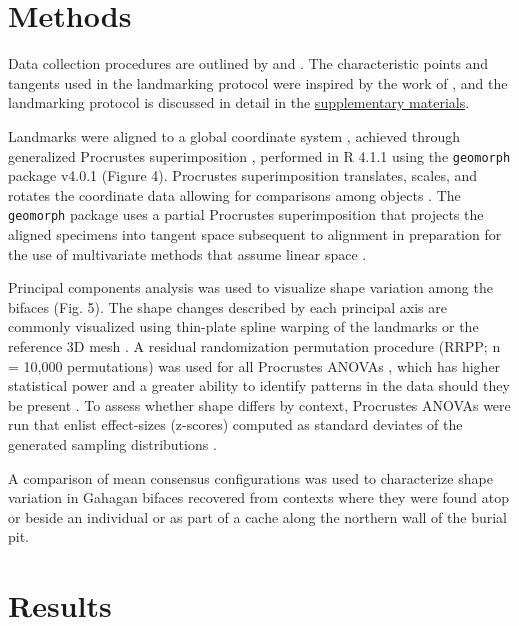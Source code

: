 \documentclass[]{interact}
\theoremstyle{plain}%
\theoremstyle{definition}
\theoremstyle{remark}
\begin{document}
\hypertarget{methods}{%
\section{Methods}\label{methods}}

Data collection procedures are outlined by \cite{RN8154} and
\cite{RN8318}. The characteristic points and tangents used in the
landmarking protocol were inspired by the work of \cite{RN5700}, and the
landmarking protocol is discussed in detail in the
\href{https://seldenlab.github.io/gahaganmorph.3/}{supplementary
materials}.

Landmarks were aligned to a global coordinate system
\citep{RN8102,RN8587,RN8384}, achieved through generalized Procrustes
superimposition \citep{RN8525}, performed in R 4.1.1 \citep{RN8584}
using the \texttt{geomorph} package v4.0.1 \citep{RN8565,RN9565} (Figure
4). Procrustes superimposition translates, scales, and rotates the
coordinate data allowing for comparisons among objects
\citep{RN5698,RN8525}. The \texttt{geomorph} package uses a partial
Procrustes superimposition that projects the aligned specimens into
tangent space subsequent to alignment in preparation for the use of
multivariate methods that assume linear space \citep{RN8511,RN8384}.

Principal components analysis \citep{RN8576,RN10875} was used to
visualize shape variation among the bifaces (Fig. 5). The shape changes
described by each principal axis are commonly visualized using
thin-plate spline warping of the landmarks or the reference 3D mesh
\citep{RN8555,RN8553}. A residual randomization permutation procedure
(RRPP; n = 10,000 permutations) was used for all Procrustes ANOVAs
\citep{RN8579,RN8334}, which has higher statistical power and a greater
ability to identify patterns in the data should they be present
\citep{RN6995}. To assess whether shape differs by context, Procrustes
ANOVAs \citep{RN7046} were run that enlist effect-sizes (z-scores)
computed as standard deviates of the generated sampling distributions
\citep{RN8477}.

A comparison of mean consensus configurations was used to characterize
shape variation in Gahagan bifaces recovered from contexts where they
were found atop or beside an individual or as part of a cache along the
northern wall of the burial pit.

\hypertarget{results}{%
\section{Results}\label{results}}
\end{document}
